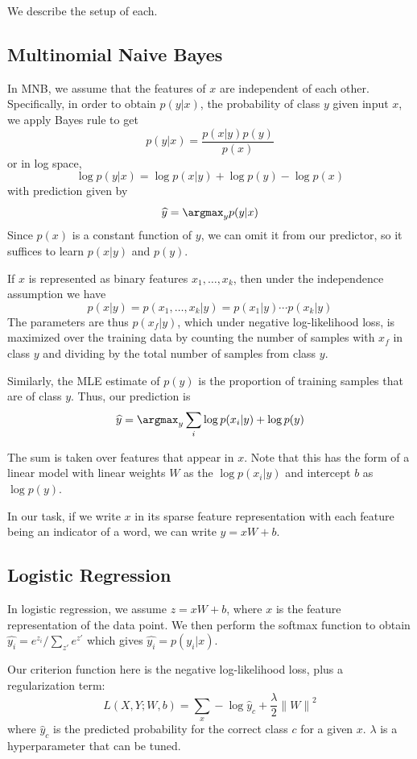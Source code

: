\documentclass[11pt]{article}
\begin{document}
We describe the setup of each.

\subsection{Multinomial Naive Bayes}

In MNB, we assume that the features of $x$ are independent of each other. Specifically, in order to obtain $p(y | x)$, the probability of class $y$ given input $x$, we apply Bayes rule to get
$$p(y | x) = \frac{p(x | y)p(y)}{p(x)}$$
or in log space,
$$\log p(y | x) = \log p(x | y) + \log p(y) - \log p(x)$$
with prediction given by
$$\widehat{y} = \argmax_y p(y|x)$$
Since $p(x)$ is a constant function of $y$, we can omit it from our predictor, so it suffices to learn $p(x | y)$ and $p(y)$.

If $x$ is represented as binary features $x_1, \ldots, x_k$, then under the independence assumption we have
$$p(x | y) = p(x_1, \ldots, x_k | y) = p(x_1 | y) \cdots p(x_k | y)$$
The parameters are thus $p(x_f | y)$, which under negative log-likelihood loss, is maximized over the training data by counting the number of samples with $x_f$ in class $y$ and dividing by the total number of samples from class $y$.

Similarly, the MLE estimate of $p(y)$ is the proportion of training samples that are of class $y$. Thus, our prediction is
$$\widehat{y} = \argmax_y \sum_i \log p(x_i | y) + \log p(y)$$

The sum is taken over features that appear in $x$. Note that this has the form of a linear model with linear weights $W$ as the $\log p(x_i | y)$ and intercept $b$ as $\log p(y)$.

In our task, if we write $x$ in its sparse feature representation with each feature being an indicator of a word, we can write $\widehat{y} = xW + b$.

\subsection{Logistic Regression}

In logistic regression, we assume $z = xW + b$, where $x$ is the feature representation of the data point. We then perform the softmax function to obtain $\widehat{y_i} = e^{z_i} / \sum_{z'} e^{z'}$ which gives $\widehat{y_i} = p(y_i | x)$.

Our criterion function here is the negative log-likelihood loss, plus a regularization term:
$$L(X, Y; W, b) = \sum_x -\log \widehat{y}_c + \frac{\lambda}{2} {\lVert W \rVert}^2$$
where $\widehat{y}_c$ is the predicted probability for the correct class $c$ for a given $x$. $\lambda$ is a hyperparameter that can be tuned.
\end{document}

